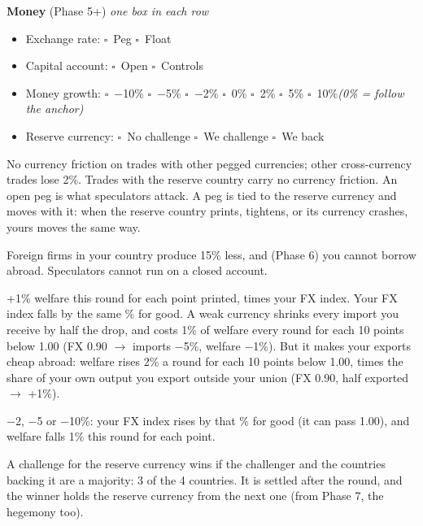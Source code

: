 \documentclass[11pt]{article}
\newcommand{\blank}[1]{\underline{\hspace{#1}}}
\newcommand{\boxx}{$\square$}
\begin{document}
{\bfseries Money} (Phase 5+) \hfill \textit{one box in each row}\par
\begin{itemize}[nosep,leftmargin=1.4em]
  \item Exchange rate: \quad \boxx\ Peg \quad \boxx\ Float
  \item Capital account: \quad \boxx\ Open \quad \boxx\ Controls
  \item Money growth: \quad \boxx\ $-$10\% \quad \boxx\ $-$5\% \quad \boxx\ $-$2\% \quad \boxx\ 0\% \quad \boxx\ 2\% \quad \boxx\ 5\% \quad \boxx\ 10\%\newline \textit{(0\% = follow the anchor)}
  \item Reserve currency: \quad \boxx\ No challenge \quad \boxx\ We challenge \quad \boxx\ We back \blank{2.2cm}
\end{itemize}
{\small
\begin{description}[nosep,style=sameline,leftmargin=5.6em,font=\normalfont\bfseries]
  \item[Peg] No currency friction on trades with other pegged currencies; other cross-currency trades lose 2\%. Trades with the reserve country carry no currency friction. An open peg is what speculators attack. A peg is tied to the reserve currency and moves with it: when the reserve country prints, tightens, or its currency crashes, yours moves the same way.
  \item[Controls] Foreign firms in your country produce 15\% less, and (Phase 6) you cannot borrow abroad. Speculators cannot run on a closed account.
  \item[Printing] +1\% welfare this round for each point printed, times your FX index. Your FX index falls by the same \% for good. A weak currency shrinks every import you receive by half the drop, and costs 1\% of welfare every round for each 10 points below 1.00 (FX 0.90 $\to$ imports $-$5\%, welfare $-$1\%). But it makes your exports cheap abroad: welfare rises 2\% a round for each 10 points below 1.00, times the share of your own output you export outside your union (FX 0.90, half exported $\to$ +1\%).
  \item[Tightening] $-$2, $-$5 or $-$10\%: your FX index rises by that \% for good (it can pass 1.00), and welfare falls 1\% this round for each point.
  \item[Challenge] A challenge for the reserve currency wins if the challenger and the countries backing it are a majority: 3 of the 4 countries. It is settled after the round, and the winner holds the reserve currency from the next one (from Phase 7, the hegemony too).
\end{description}}
\end{document}
